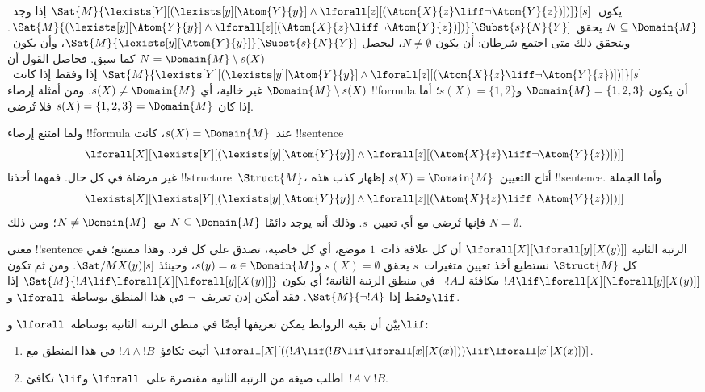 \documentclass[../../../include/open-logic-section]{subfiles}
\begin{document}
\begin{ex}
  يكون~$\Sat{M}{\lexists[Y][(\lexists[y][\Atom{Y}{y}] \land
  \lforall[z][(\Atom{X}{z} \liff \lnot \Atom{Y}{z})])]}[s]$ إذا
  وجد~$N \subseteq \Domain{M}$ يحقق
  $\Sat{M}{(\lexists[y][\Atom{Y}{y}] \land \lforall[z][(\Atom{X}{z}
  \liff \lnot \Atom{Y}{z})])}[\Subst{s}{N}{Y}]$.
  ويتحقق ذلك متى اجتمع شرطان: أن يكون
  $N \neq \emptyset$، ليحصل
  $\Sat{M}{\lexists[y][\Atom{Y}{y}]}[\Subst{s}{N}{Y}]$،
  وأن يكون~$N = \Domain{M} \setminus s(X)$ كما سبق.
  فحاصل القول أن
  $\Sat{M}{\lexists[Y][(\lexists[y][\Atom{Y}{y}] \land
  \lforall[z][(\Atom{X}{z} \liff \lnot \Atom{Y}{z})])]}[s]$ إذا
  وفقط إذا كانت~$\Domain{M} \setminus s(X)$ غير خالية، أي
  $s(X) \neq \Domain{M}$. ومن أمثلة إرضاء !!{formula} أن يكون
  $\Domain{M} = \{1, 2, 3\}$ و$s(X) = \{1, 2\}$؛ أما إذا كان
  $s(X) = \{1, 2, 3\} = \Domain{M}$ فلا تُرضى.

  ولما امتنع إرضاء !!{formula} عند~$s(X) = \Domain{M}$، كانت
  !!{sentence}
  \[
  \lforall[X][\lexists[Y][(\lexists[y][\Atom{Y}{y}] \land
      \lforall[z][(\Atom{X}{z} \liff \lnot \Atom{Y}{z})])]]
  \]
  غير مرضاة في كل حال. فمهما أخذنا !!{structure}~$\Struct{M}$،
  أتاح التعيين~$s(X) = \Domain{M}$ إظهار كذب هذه !!{sentence}.
  وأما الجملة
  \[
  \lexists[X][\lexists[Y][(\lexists[y][\Atom{Y}{y}] \land
      \lforall[z][(\Atom{X}{z} \liff \lnot \Atom{Y}{z})])]]
  \]
  فإنها تُرضى مع أي تعيين~$s$. وذلك أنه يوجد دائمًا
  $N \subseteq \Domain{M}$ مع~$N \neq \Domain{M}$؛ ومن ذلك
  $N = \emptyset$.
\end{ex}

\begin{ex}
  معنى !!{sentence} الرتبة الثانية
  $\lforall[X][\lforall[y][X(y)]]$ أن كل علاقة ذات~$1$ موضع،
  أي كل خاصية، تصدق على كل فرد. وهذا ممتنع؛ ففي كل
  $\Struct{M}$ نستطيع أخذ تعيين متغيرات~$s$ يحقق
  $s(X) = \emptyset$ و$s(y) = a \in \Domain{M}$، وحينئذ
  $\Sat/{M}{X(y)}[s]$. ومن ثم تكون
  $!A \lif \lforall[X][\lforall[y][X(y)]]$ مكافئة
  لـ$\lnot !A$ في منطق الرتبة الثانية؛ أي يكون
  $\Sat{M}{!A \lif \lforall[X][\lforall[y][X(y)]]}$ إذا وفقط إذا
  $\Sat{M}{\lnot !A}$. فقد أمكن إذن تعريف~$\lnot$
  في هذا المنطق بوساطة~$\lforall$ و$\lif$.
\end{ex}

\begin{prob}
  بيّن أن بقية الروابط يمكن تعريفها أيضًا في منطق الرتبة الثانية
  بوساطة~$\lforall$ و$\lif$:
  \begin{enumerate}
    \item أثبت تكافؤ~$!A \land !B$ في هذا المنطق مع
    $\lforall[X][((!A \lif (!B \lif \lforall[x][X(x)])) \lif
    \lforall[x][X(x)])]$.
    \item اطلب صيغة من الرتبة الثانية مقتصرة على~$\lforall$
    و$\lif$ تكافئ~$!A \lor !B$.
  \end{enumerate}
\end{prob}
\end{document}

